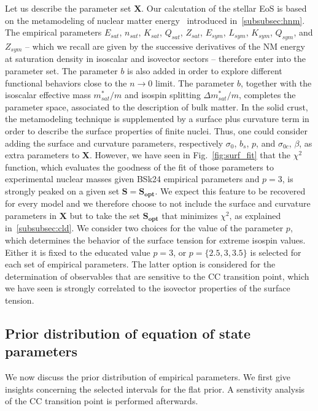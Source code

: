 Let us describe the parameter set $\bm{X}$. Our calcutation
of the stellar EoS is based on the metamodeling of nuclear matter
energy~\cite{Margueron2018a} introduced in~\ref{subsubsec:hnm}. The empirical
parameters $E_{sat}$, $n_{sat}$, $K_{sat}$, $Q_{sat}$, $Z_{sat}$, $E_{sym}$,
$L_{sym}$, $K_{sym}$, $Q_{sym}$, and $Z_{sym}$ -- which we recall are given by 
the successive derivatives of the NM energy at saturation density in isoscalar 
and isovector sectors -- therefore 
enter into the parameter set. The parameter $b$ is also added in order 
to explore different functional behaviors close to the $n\rightarrow 0$ limit.
The parameter $b$, together with the isoscalar effective mass $m_{sat}^*/m$ and 
isospin splitting $\Delta m_{sat}^*/m$, completes the parameter space, 
associated to the description of bulk matter.
In the solid crust, the metamodeling technique is supplemented by a surface 
plus curvature term in order to describe the surface properties of finite 
nuclei. Thus, one could consider adding the surface and curvature parameters, 
respectively $\sigma_0$, $b_s$, $p$, and $\sigma_{0c}$, $\beta$, as extra
parameters to $\bm{X}$. However, we have
seen in Fig.~\ref{fig:surf_fit} that the $\chi^2$ function, which evaluates the 
goodness of the fit of those parameters to experimental nuclear masses given 
BSk24 empirical parameters and $p=3$, is strongly peaked on a given set
$\bm{S}=\bm{S_{opt}}$. We expect this 
feature to be recovered for every model and we therefore choose to not include 
the surface and curvature parameters in $\bm{X}$ but to take the set 
$\bm{S_{opt}}$ that minimizes $\chi^2$, as explained in~\ref{subsubsec:cld}. 
We consider two choices for the value of the parameter $p$, which determines 
the behavior of the surface tension for extreme isospin values. Either it is 
fixed to the educated value $p=3$, or $p=\{2.5,3,3.5\}$ is selected for each
set of empirical parameters. The latter option is considered for the
determination of observables that are sensitive to the CC transition point, 
which we have seen is strongly correlated to the isovector properties of the 
surface tension.

\subsection{Prior distribution of equation of state parameters}\label{subsec:prior}

We now discuss the prior distribution of empirical parameters. We first give 
insights concerning the selected intervals for the flat prior. A senstivity 
analysis of the CC transition point is performed afterwards.

